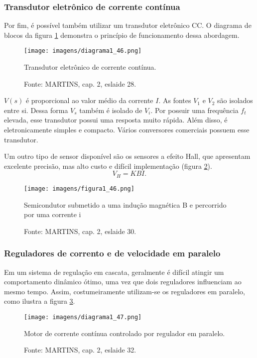 \subsubsection{Transdutor eletrônico de corrente contínua}
Por fim, é possível também utilizar um transdutor eletrônico CC. O diagrama de blocos da figura \ref{fig:D1_46} demonstra o princípio de funcionamento dessa abordagem.

\begin{figure}[ht!]
\center
\texttt{[image: imagens/diagrama1\_46.png]}
\caption{\label{fig:D1_46} Transdutor eletrônico de corrente contínua.}
\caption*{Fonte: MARTINS, cap. 2, eslaide 28.}
\end{figure}

$V(s)$ é proporcional ao valor médio da corrente $I$. As fontes $V_{1}$ e $V_{2}$ são isolados entre si. Dessa forma $V_{s}$ também é isolado de $V_{i}$. Por possuir uma frequência $f_{t}$ elevada, esse transdutor possui uma resposta muito rápida. Além disso, é eletronicamente simples e compacto. Vários conversores comerciais possuem esse transdutor.

Um outro tipo de sensor disponível são os sensores a efeito Hall, que apresentam excelente precisão, mas alto custo e difícil implementação (figura \ref{fig:F1_46}).
\[V_{H} = KBI.\]

\begin{figure}[ht!]
\center
\texttt{[image: imagens/figura1\_46.png]}
\caption{\label{fig:F1_46} Semicondutor submetido a uma indução magnética B e percorrido por uma corrente i}
\caption*{Fonte: MARTINS, cap. 2, eslaide 30.}
\end{figure}

\subsubsection{Reguladores de corrento e de velocidade em paralelo}

Em um sistema de regulação em cascata, geralmente é difícil atingir um comportamento dinâmico ótimo, uma vez que dois reguladores influenciam ao mesmo tempo. Assim, costumeiramente utilizam-se os reguladores em paralelo, como ilustra a figura \ref{fig:D1_47}.

\begin{figure}[ht!]
\center
\texttt{[image: imagens/diagrama1\_47.png]}
\caption{\label{fig:D1_47} Motor de corrente contínua controlado por regulador em paralelo.}
\caption*{Fonte: MARTINS, cap. 2, eslaide 32.}
\end{figure}

